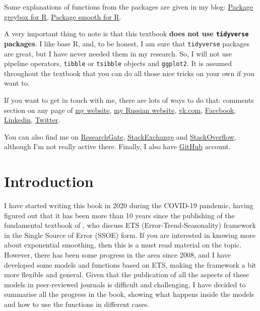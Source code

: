 \documentclass[]{book}
\begin{document}
Some explanations of functions from the packages are given in my blog: \href{https://forecasting.svetunkov.ru/en/category/r-en/greybox/}{Package greybox for R}, \href{https://forecasting.svetunkov.ru/en/category/r-en/smooth/}{Package smooth for R}.

A very important thing to note is that this textbook \textbf{does not use \texttt{tidyverse} packages}. I like base R, and, to be honest, I am sure that \texttt{tidyverse} packages are great, but I have never needed them in my research. So, I will not use pipeline operators, \texttt{tibble} or \texttt{tsibble} objects and \texttt{ggplot2}. It is assumed throughout the textbook that you can do all those nice tricks on your own if you want to.

If you want to get in touch with me, there are lots of ways to do that: comments section on any page of \href{https://forecasting.svetunkov.ru/}{my website}, \href{https://ivan.svetunkov.ru/}{my Russian website}, \href{https://vk.com/isvetunkov}{vk.com}, \href{https://www.facebook.com/isvetunkov}{Facebook}, \href{https://www.linkedin.com/in/isvetunkov}{Linkedin}, \href{https://twitter.com/iSvetunkov}{Twitter}.

You can also find me on \href{https://www.researchgate.net/profile/Ivan_Svetunkov}{ResearchGate}, \href{http://stats.stackexchange.com/users/87585/ivan-svetunkov}{StackExchange} and \href{http://stackoverflow.com/users/5296618/ivan-svetunkov}{StackOverflow}, although I'm not really active there. Finally, I also have \href{https://github.com/config-i1}{GitHub} account.

\hypertarget{intro}{%
\chapter{Introduction}\label{intro}}

I have started writing this book in 2020 during the COVID-19 pandemic, having figured out that it has been more than 10 years since the publishing of the fundamental textbook of \citep{Hyndman2008b}, who discuss ETS (Error-Trend-Seasonality) framework in the Single Source of Error (SSOE) form. If you are interested in knowing more about exponential smoothing, then this is a must read material on the topic. However, there has been some progress in the area since 2008, and I have developed some models and functions based on ETS, making the framework a bit more flexible and general. Given that the publication of all the aspects of these models in peer-reviewed journals is difficult and challenging, I have decided to summarise all the progress in the book, showing what happens inside the models and how to use the functions in different cases.
\end{document}
